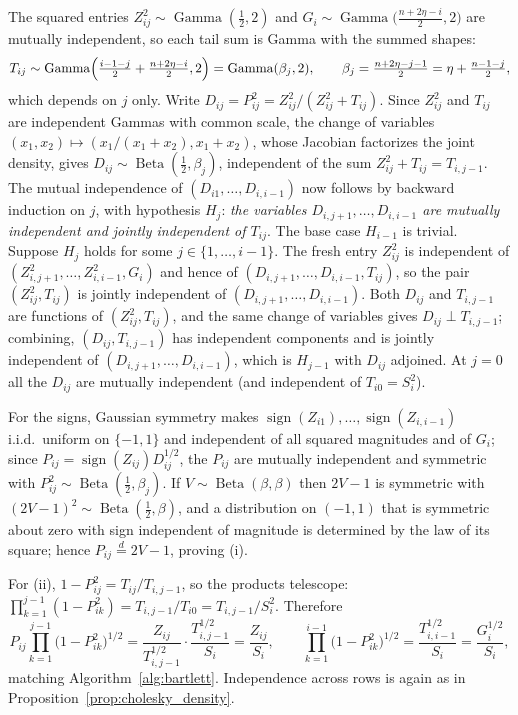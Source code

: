 \documentclass[12pt,english]{article}
\makeatletter
\theoremstyle{plain} %
\theoremstyle{definition} %
\theoremstyle{remark} %
\renewenvironment{proof}[1][\proofname]{\par
  \pushQED{\qed}%
  \normalfont \topsep6\p@\@plus6\p@\relax
  \trivlist
  \item[\hskip\labelsep\bfseries#1:]\ignorespaces
}{%
  \popQED\endtrivlist\@endpefalse
}
\makeatother
\begin{document}
\begin{proof}
The squared entries $Z_{ij}^2\sim\operatorname{Gamma}(\tfrac12,2)$ and $G_i\sim\operatorname{Gamma}\bigl(\tfrac{n+2\eta-i}{2},2\bigr)$ are mutually independent, so each tail sum is Gamma with the summed shapes:
$$
T_{ij}\sim\operatorname{Gamma}\Bigl(\tfrac{i-1-j}{2}+\tfrac{n+2\eta-i}{2},2\Bigr)=\operatorname{Gamma}(\beta_j,2),
\qquad
\beta_j=\tfrac{n+2\eta-j-1}{2}=\eta+\tfrac{n-1-j}{2},
$$
which depends on $j$ only. Write $D_{ij}=P_{ij}^2=Z_{ij}^2/(Z_{ij}^2+T_{ij})$. Since $Z_{ij}^2$ and $T_{ij}$ are independent Gammas with common scale, the change of variables $(x_1,x_2)\mapsto(x_1/(x_1+x_2),x_1+x_2)$, whose Jacobian factorizes the joint density, gives $D_{ij}\sim\operatorname{Beta}(\tfrac12,\beta_j)$, independent of the sum $Z_{ij}^2+T_{ij}=T_{i,j-1}$. The mutual independence of $(D_{i1},\ldots,D_{i,i-1})$ now follows by backward induction on $j$, with hypothesis $H_j$: \emph{the variables $D_{i,j+1},\ldots,D_{i,i-1}$ are mutually independent and jointly independent of $T_{ij}$}. The base case $H_{i-1}$ is trivial. Suppose $H_j$ holds for some $j\in\{1,\ldots,i-1\}$. The fresh entry $Z_{ij}^2$ is independent of $(Z_{i,j+1}^2,\ldots,Z_{i,i-1}^2,G_i)$ and hence of $(D_{i,j+1},\ldots,D_{i,i-1},T_{ij})$, so the pair $(Z_{ij}^2,T_{ij})$ is jointly independent of $(D_{i,j+1},\ldots,D_{i,i-1})$. Both $D_{ij}$ and $T_{i,j-1}$ are functions of $(Z_{ij}^2,T_{ij})$, and the same change of variables gives $D_{ij}\perp T_{i,j-1}$; combining, $(D_{ij},T_{i,j-1})$ has independent components and is jointly independent of $(D_{i,j+1},\ldots,D_{i,i-1})$, which is $H_{j-1}$ with $D_{ij}$ adjoined. At $j=0$ all the $D_{ij}$ are mutually independent (and independent of $T_{i0}=S_i^2$).

For the signs, Gaussian symmetry makes $\operatorname{sign}(Z_{i1}),\ldots,\operatorname{sign}(Z_{i,i-1})$ i.i.d.\ uniform on $\{-1,1\}$ and independent of all squared magnitudes and of $G_i$; since $P_{ij}=\operatorname{sign}(Z_{ij})D_{ij}^{1/2}$, the $P_{ij}$ are mutually independent and symmetric with $P_{ij}^2\sim\operatorname{Beta}(\tfrac12,\beta_j)$. If $V\sim\operatorname{Beta}(\beta,\beta)$ then $2V-1$ is symmetric with $(2V-1)^2\sim\operatorname{Beta}(\tfrac12,\beta)$, and a distribution on $(-1,1)$ that is symmetric about zero with sign independent of magnitude is determined by the law of its square; hence $P_{ij}\overset{d}{=}2V-1$, proving (i).

For (ii), $1-P_{ij}^2=T_{ij}/T_{i,j-1}$, so the products telescope: $\prod_{k=1}^{j-1}(1-P_{ik}^2)=T_{i,j-1}/T_{i0}=T_{i,j-1}/S_i^2$. Therefore
$$
P_{ij}\prod_{k=1}^{j-1}\bigl(1-P_{ik}^2\bigr)^{1/2}
=\frac{Z_{ij}}{T_{i,j-1}^{1/2}}\cdot\frac{T_{i,j-1}^{1/2}}{S_i}
=\frac{Z_{ij}}{S_i},
\qquad
\prod_{k=1}^{i-1}\bigl(1-P_{ik}^2\bigr)^{1/2}=\frac{T_{i,i-1}^{1/2}}{S_i}=\frac{G_i^{1/2}}{S_i},
$$
matching Algorithm~\ref{alg:bartlett}. Independence across rows is again as in Proposition~\ref{prop:cholesky_density}.
\end{proof}
\end{document}
